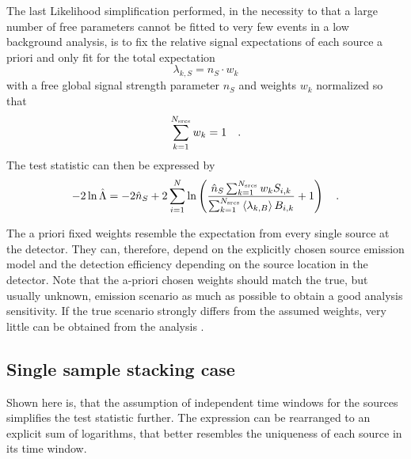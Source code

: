 The last Likelihood simplification performed, in the necessity to that a large number of free parameters cannot be fitted to very few events in a low background analysis, is to fix the relative signal expectations of each source a priori and only fit for the total expectation
\begin{equation}
  \lambda_{k,S} = n_S \cdot w_k
\end{equation}
with a free global signal strength parameter $n_S$ and weights $w_k$ normalized so that
\begin{equation}
  \sum_{k=1}^{N_\text{srcs}} w_k = 1
  \quad\text{.}
\end{equation}
The test statistic can then be expressed by
\begin{equation}
  -2\ln\hat{\Lambda}
  = -2\hat{n}_S +
      2\sum_{i=1}^N \ln\left(
        \frac{\hat{n}_S \sum_{k=1}^{N_\text{srcs}} w_k S_{i,k}}
             {\sum_{k=1}^{N_\text{srcs}}\Braket{\lambda_{k,B}} B_{i,k}}
        + 1
      \right)
  \quad\text{.}
\end{equation}

The a priori fixed weights resemble the expectation from every single source at the detector.
They can, therefore, depend on the explicitly chosen source emission model and the detection efficiency depending on the source location in the detector.
Note that the a-priori chosen weights should match the true, but usually unknown, emission scenario as much as possible to obtain a good analysis sensitivity.
If the true scenario strongly differs from the assumed weights, very little can be obtained from the analysis .


\subsection{Single sample stacking case}
Shown here is, that the assumption of independent time windows for the sources simplifies the test statistic further.
The expression can be rearranged to an explicit sum of logarithms, that better resembles the uniqueness of each source in its time window.

